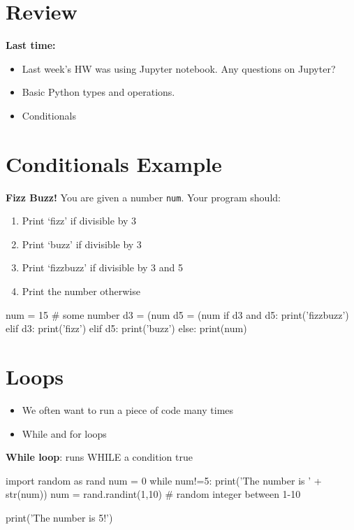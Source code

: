\documentclass[12pt]{article}
\numberwithin{equation}{section}
\begin{document}
\section{Review}

\textbf{Last time:}
\begin{itemize}
    \item Last week's HW was using Jupyter notebook. Any questions on Jupyter?
    \item Basic Python types and operations.
    \item Conditionals
\end{itemize}

\section{Conditionals Example}
\textbf{Fizz Buzz!} You are given a number \verb|num|. Your program should:
\begin{enumerate}
    \item Print `fizz' if divisible by 3
    \item Print `buzz' if divisible by 3
    \item Print `fizzbuzz' if divisible by 3 and 5
    \item Print the number otherwise
\end{enumerate}

\begin{python}
num = 15 # some number
d3 = (num%
d5 = (num%
if d3 and d5:
    print('fizzbuzz')
elif d3:
    print('fizz')
elif d5:
    print('buzz')
else:
    print(num)
\end{python}

\section{Loops}
\begin{itemize}
    \item We often want to run a piece of code many times
    \item While and for loops
\end{itemize}

\textbf{While loop}: runs WHILE a condition true
\begin{python}
import random as rand
num = 0
while num!=5:
    print('The number is ' + str(num))
    num = rand.randint(1,10) # random integer between 1-10

print('The number is 5!')
\end{python}
\end{document}
